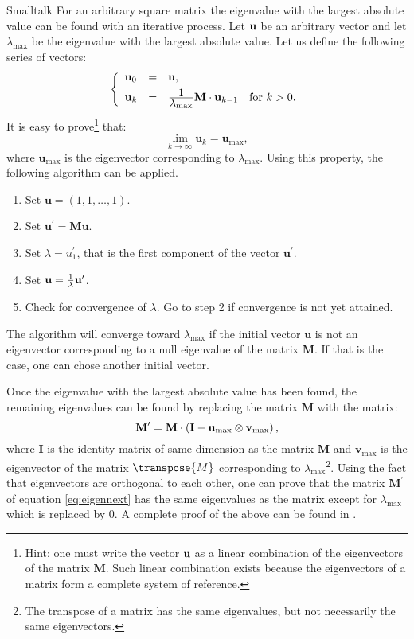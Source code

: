 \begin{displaycode}{Smalltalk}
For an arbitrary square matrix the eigenvalue with the largest
absolute value can be found with an iterative process. Let ${\textbf
u}$ be an arbitrary vector and let $\lambda_{\max}$ be the
eigenvalue with the largest absolute value. Let us define the
following series of vectors:
\begin{equation}
\left\{
  \begin{array}{lcl}
    \textbf{u}_0 &=& \textbf{u}, \\*[1ex]
    \textbf{u}_k &=& {\displaystyle 1\over\displaystyle\lambda_{\max}}\textbf{M}\cdot{\textbf
    u}_{k-1}\mbox{\quad for $k>0$}.
  \end{array}
\right.
\end{equation}
It is easy to prove\footnote{Hint: one must write the vector ${\textbf
u}$ as a linear combination of the eigenvectors of the matrix
$\textbf{M}$. Such linear combination exists because the eigenvectors
of a matrix form a complete system of reference.} that:
\begin{equation}
  \lim_{k\to\infty}\textbf{u}_k=\textbf{u}_{\max},
\end{equation}
where $\textbf{u}_{\max}$ is the eigenvector corresponding to
$\lambda_{\max}$. Using this property, the following algorithm can
be applied.
\begin{enumerate}
  \item Set $\textbf{u}=\left(1,1,\ldots,1\right)$.
  \item Set $\textbf{u}^{\prime}=\textbf{M}\textbf{u}$.
  \item Set $\lambda=u^{\prime}_1$, that is the first component of the
  vector $\textbf{u}^{\prime}$.
  \item Set $\textbf{u}= {1\over\lambda}\textbf{u}^{\prime}$.
  \item Check for convergence of $\lambda$. Go to step 2 if
  convergence is not yet attained.
\end{enumerate}
The algorithm will converge toward $\lambda_{\max}$ if the initial
vector $\textbf{u}$ is not an eigenvector corresponding to a null
eigenvalue of the matrix $\textbf{M}$. If that is the case, one can
chose another initial vector.

Once the eigenvalue with the largest absolute value has been
found, the remaining eigenvalues can be found by replacing the
matrix $\textbf{M}$ with the matrix:
\begin{equation}
\label{eq:eigennext}
  \textbf{M}^{\prime}=\textbf{M}\cdot\left(\textbf{I}-\textbf{u}_{\max}\otimes{\textbf
  v}_{\max}\right),
\end{equation}
where $\textbf{I}$ is the identity matrix of same dimension as the
matrix $\textbf{M}$ and $\textbf{v}_{\max}$ is the eigenvector of the
matrix $\transpose{M}$ corresponding to
$\lambda_{\max}$\footnote{The transpose of a matrix has the same
eigenvalues, but not necessarily the same eigenvectors.}. Using
the fact that eigenvectors are orthogonal to each other, one can
prove that the matrix $\textbf{M}^{\prime}$ of equation
\ref{eq:eigennext} has the same eigenvalues as the matrix except
for $\lambda_{\max}$ which is replaced by 0. A complete proof of
the above can be found in \cite{Bass}.


\end{displaycode}
